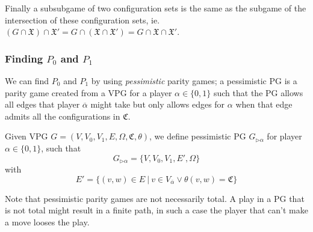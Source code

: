 Finally a subsubgame of two configuration sets is the same as the subgame of the intersection of these configuration sets, ie. $(G \cap \mathfrak{X}) \cap \mathfrak{X}' = G \cap (\mathfrak{X} \cap \mathfrak{X}') = G \cap \mathfrak{X} \cap \mathfrak{X}'$.

\subsubsection{Finding $P_0$ and $P_1$}
We can find $P_0$ and $P_1$ by using \textit{pessimistic} parity games; a pessimistic PG is a parity game created from a VPG for a player $\alpha \in \{0,1\}$ such that the PG allows all edges that player $\overline{\alpha}$ might take but only allows edges for $\alpha$ when that edge admits all the configurations in $\mathfrak{C}$.
\begin{definition}
	\label{def_pess_game}
	Given VPG $G = (V,V_0,V_1,E,\Omega, \mathfrak{C},\theta)$, we define pessimistic PG $G_{\triangleright\alpha}$ for player $\alpha \in \{0,1\}$, such that
	\[ G_{\triangleright\alpha} = \{V,V_0,V_1,E',\Omega \} \]
	with
	\[ E' = \{ (v,w) \in E\ |\ v \in V_{\overline{\alpha}} \vee \theta(v,w) = \mathfrak{C} \} \]
\end{definition}


Note that pessimistic parity games are not necessarily total. A play in a PG that is not total might result in a finite path, in such a case the player that can't make a move looses the play.

